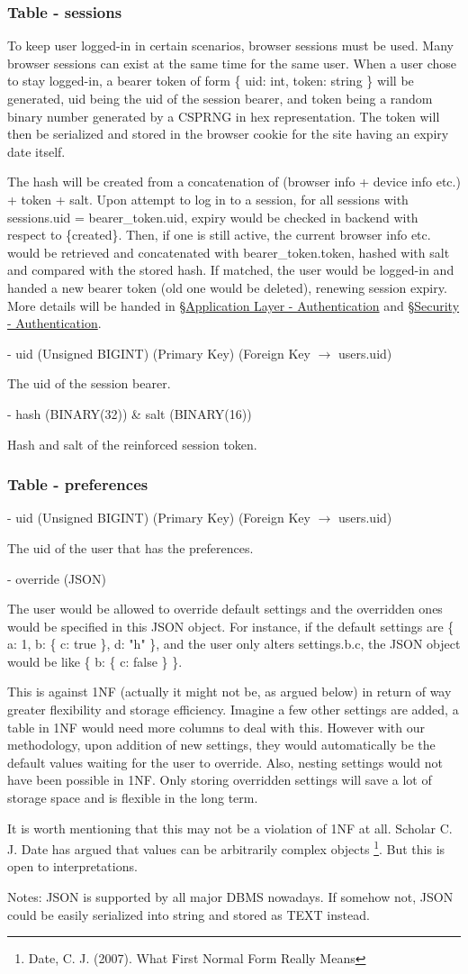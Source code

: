 \documentclass[12pt]{report}
\newcommand{\n}{\par}
\newcommand{\br}{\n\vspace{1 em}\n}
\begin{document}
\subsubsection{Table - sessions} \label{data-layer.design.user-system.sessions}
To keep user logged-in in certain scenarios, browser sessions must be used.
Many browser sessions can exist at the same time for the same user.
When a user chose to stay logged-in, a bearer token of form
\{ uid: int, token: string \}
will be generated,
uid being the uid of the session bearer, and
token being a random binary number generated by a CSPRNG in hex representation.
The token will then be serialized and stored in the browser cookie for the site having an expiry date itself.\n
The hash will be created from a concatenation of (browser info + device info etc.) + token + salt.
Upon attempt to log in to a session,
for all sessions with sessions.uid = bearer\_token.uid,
expiry would be checked in backend with respect to \{created\}.
Then, if one is still active, the current browser info etc. would be retrieved and concatenated with bearer\_token.token,
hashed with salt and compared with the stored hash.
If matched, the user would be logged-in and handed a new bearer token (old one would be deleted), renewing session expiry.
More details will be handed in \S \hyperref[application-layer.implementation.authentication]{Application Layer - Authentication} and
\S \hyperref[security.authentication]{Security - Authentication}.
\br
- uid (Unsigned BIGINT) (Primary Key) (Foreign Key $\rightarrow$ users.uid)\n
The uid of the session bearer.
\br
- hash (BINARY(32)) \& salt (BINARY(16))\n
Hash and salt of the reinforced session token.

\subsubsection{Table - preferences} \label{data-layer.design.user-system.preferences}
- uid (Unsigned BIGINT) (Primary Key) (Foreign Key $\rightarrow$ users.uid)\n
The uid of the user that has the preferences.
\br
- override (JSON)\n
The user would be allowed to override default settings and the overridden ones would be specified in this JSON object.
For instance, if the default settings are \{ a: 1, b: \{ c: true \}, d: "h" \},
and the user only alters settings.b.c, the JSON object would be like \{ b: \{ c: false \} \}.\n
This is against 1NF (actually it might not be, as argued below) in return of way greater flexibility and storage efficiency.
Imagine a few other settings are added, a table in 1NF would need more columns to deal with this.
However with our methodology, upon addition of new settings, they would automatically be the default values waiting for the user to override.
Also, nesting settings would not have been possible in 1NF.
Only storing overridden settings will save a lot of storage space and is flexible in the long term.\n
It is worth mentioning that this may not be a violation of 1NF at all.
Scholar C. J. Date has argued that values can be arbitrarily complex objects \footnote{Date, C. J. (2007). What First Normal Form Really Means}.
But this is open to interpretations.\n
Notes: JSON is supported by all major DBMS nowadays. If somehow not, JSON could be easily serialized into string and stored as TEXT instead.
\end{document}
